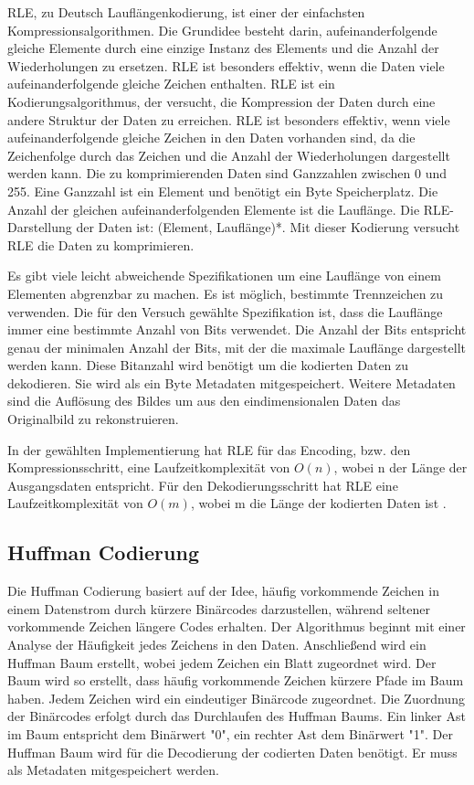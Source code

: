 \documentclass[conference]{IEEEtran}
\begin{document}
RLE, zu Deutsch Lauflängenkodierung, ist einer der einfachsten Kompressionsalgorithmen. 
Die Grundidee besteht darin, aufeinanderfolgende gleiche Elemente durch eine einzige 
Instanz des Elements und die Anzahl der Wiederholungen zu ersetzen. 
RLE ist besonders effektiv, wenn die Daten viele aufeinanderfolgende gleiche Zeichen 
enthalten. 
RLE ist ein Kodierungsalgorithmus, der versucht, die Kompression der Daten durch eine 
andere Struktur der Daten zu erreichen. 
RLE ist besonders effektiv, wenn viele aufeinanderfolgende gleiche Zeichen in den Daten 
vorhanden sind, da die Zeichenfolge durch das Zeichen und die Anzahl der Wiederholungen 
dargestellt werden kann. 
Die zu komprimierenden Daten sind Ganzzahlen zwischen 0 und 255. 
Eine Ganzzahl ist ein Element und benötigt ein Byte Speicherplatz. 
Die Anzahl der gleichen aufeinanderfolgenden Elemente ist die Lauflänge. 
Die RLE-Darstellung der Daten ist: (Element, Lauflänge)*. 
Mit dieser Kodierung versucht RLE die Daten zu komprimieren.

Es gibt viele leicht abweichende Spezifikationen um eine Lauflänge
von einem Elementen abgrenzbar zu machen.
Es ist möglich, bestimmte Trennzeichen zu verwenden.
Die für den Versuch gewählte Spezifikation ist, dass die Lauflänge immer 
eine bestimmte Anzahl von Bits verwendet.
Die Anzahl der Bits entspricht genau der minimalen Anzahl der Bits, mit 
der die maximale Lauflänge dargestellt werden kann.
Diese Bitanzahl wird benötigt um die kodierten Daten zu dekodieren.
Sie wird als ein Byte Metadaten mitgespeichert.
Weitere Metadaten sind die
Auflösung des Bildes um aus den eindimensionalen Daten das Originalbild
zu rekonstruieren.

In der gewählten Implementierung hat RLE für das Encoding, bzw. den Kompressionsschritt, 
eine Laufzeitkomplexität von $O(n)$, wobei n der Länge der Ausgangsdaten entspricht.
Für den Dekodierungsschritt hat RLE eine Laufzeitkomplexität von $O(m)$, wobei 
m die Länge der kodierten Daten ist \cite{nick}. 


\subsection{Huffman Codierung}

Die Huffman Codierung basiert auf der Idee, häufig vorkommende Zeichen 
in einem Datenstrom durch kürzere Binärcodes darzustellen, während seltener 
vorkommende Zeichen längere Codes erhalten.
Der Algorithmus beginnt mit einer Analyse der Häufigkeit jedes Zeichens in den Daten.
Anschließend wird ein Huffman Baum erstellt, wobei jedem Zeichen ein Blatt zugeordnet wird.
Der Baum wird so erstellt, dass häufig vorkommende Zeichen kürzere Pfade im Baum haben. 
Jedem Zeichen wird ein eindeutiger Binärcode zugeordnet. 
Die Zuordnung der Binärcodes erfolgt durch das Durchlaufen des Huffman Baums. 
Ein linker Ast im Baum entspricht dem Binärwert "0", ein rechter Ast dem 
Binärwert "1". Der Huffman Baum wird für die Decodierung der codierten Daten benötigt. 
Er muss als Metadaten mitgespeichert werden.
\end{document}
